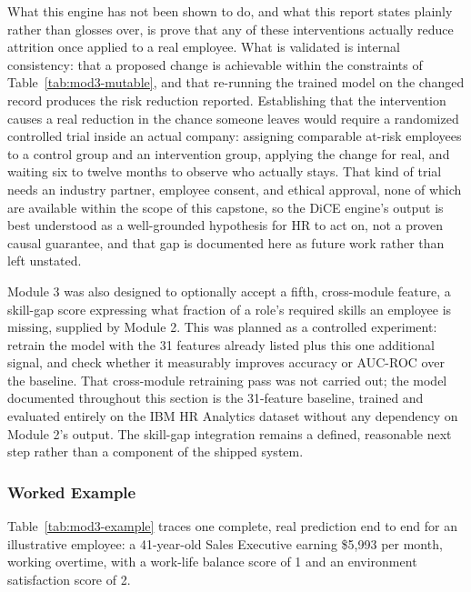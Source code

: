\documentclass[11pt,a4paper]{article}
\begin{document}
What this engine has not been shown to do, and what this report states plainly rather than glosses over, is prove that any of these interventions actually reduce attrition once applied to a real employee. What is validated is internal consistency: that a proposed change is achievable within the constraints of Table~\ref{tab:mod3-mutable}, and that re-running the trained model on the changed record produces the risk reduction reported. Establishing that the intervention causes a real reduction in the chance someone leaves would require a randomized controlled trial inside an actual company: assigning comparable at-risk employees to a control group and an intervention group, applying the change for real, and waiting six to twelve months to observe who actually stays. That kind of trial needs an industry partner, employee consent, and ethical approval, none of which are available within the scope of this capstone, so the DiCE engine's output is best understood as a well-grounded hypothesis for HR to act on, not a proven causal guarantee, and that gap is documented here as future work rather than left unstated.

Module 3 was also designed to optionally accept a fifth, cross-module feature, a skill-gap score expressing what fraction of a role's required skills an employee is missing, supplied by Module 2. This was planned as a controlled experiment: retrain the model with the 31 features already listed plus this one additional signal, and check whether it measurably improves accuracy or AUC-ROC over the baseline. That cross-module retraining pass was not carried out; the model documented throughout this section is the 31-feature baseline, trained and evaluated entirely on the IBM HR Analytics dataset without any dependency on Module 2's output. The skill-gap integration remains a defined, reasonable next step rather than a component of the shipped system.

\subsubsection{Worked Example}

Table~\ref{tab:mod3-example} traces one complete, real prediction end to end for an illustrative employee: a 41-year-old Sales Executive earning \$5{,}993 per month, working overtime, with a work-life balance score of 1 and an environment satisfaction score of 2.
\end{document}
